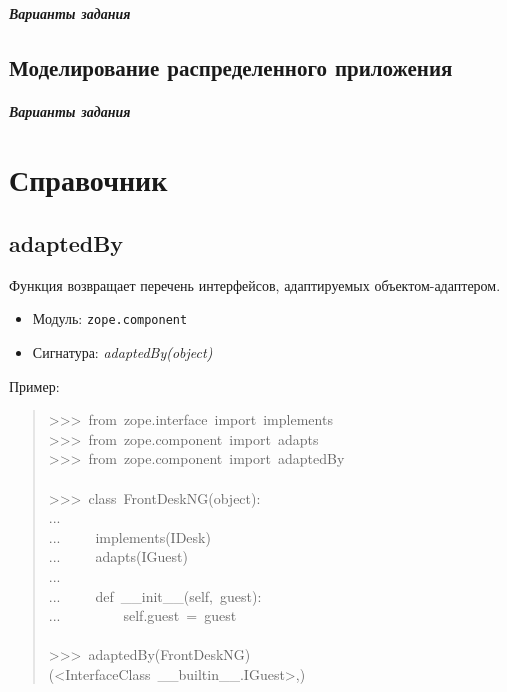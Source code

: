 \documentclass[a4paper,openany,twoside,final]{book}
\providecommand*{\DUroletitlereference}[1]{\textsl{#1}}
\begin{document}
\newpage
\paragraph{Варианты задания}
\newpage

\section{Моделирование распределенного приложения}
\label{sec:labmodel}
\newpage

\paragraph{Варианты задания}
\newpage


\chapter{Справочник%
  \label{id54}%
}


\section*{adaptedBy%
  \label{adaptedby}%
}

Функция возвращает перечень интерфейсов, адаптируемых
объектом-адаптером.

\begin{itemize}

\item Модуль: \texttt{zope.component}

\item Сигнатура: \DUroletitlereference{adaptedBy(object)}

\end{itemize}

Пример:

\begin{quote}{\ttfamily \raggedright \noindent
>{}>{}>~from~zope.interface~import~implements\\
>{}>{}>~from~zope.component~import~adapts\\
>{}>{}>~from~zope.component~import~adaptedBy\\
~\\
>{}>{}>~class~FrontDeskNG(object):\\
...\\
...~~~~~implements(IDesk)\\
...~~~~~adapts(IGuest)\\
...\\
...~~~~~def~\_\_init\_\_(self,~guest):\\
...~~~~~~~~~self.guest~=~guest\\
~\\
>{}>{}>~adaptedBy(FrontDeskNG)\\
(<InterfaceClass~\_\_builtin\_\_.IGuest>,)
}
\end{quote}
\end{document}
